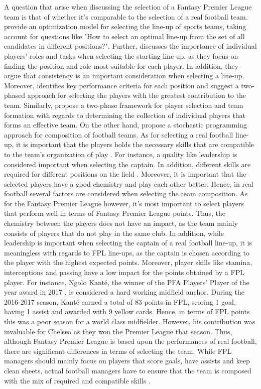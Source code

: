 A question that arise when discussing the selection of a Fantasy Premier League team is that of whether it's comparable to the selection of a real football team. \cite{Boon} provide an optimization model for selecting the line-up of sports teams, taking account for questions like "How to select an optimal line-up from the set of all candidates in different positions?". Further, \cite{Trninic} discusses the importance of individual players' roles and tasks when selecting the starting line-up, as they focus on finding the position and role most suitable for each player. In addition, they argue that consistency is an important consideration when selecting a line-up. Moreover, \cite{Ozceylan} identifies key performance criteria for each position and suggest a two-phased approach for selecting the players with the greatest contribution to the team. Similarly, \cite{Tavana} propose a two-phase framework for player selection and team formation with regards to determining the collection of individual players that forms an effective team. On the other hand, \cite{Pantuso} propose a stochastic programming approach for composition of football teams. 
\newpar
As for selecting a real football line-up, it is important that the players holds the necessary skills that are compatible to the team's organization of play \citep{Pantuso}. For instance, a quality like leadership is considered important when selecting the captain. In addition, different skills are required for different positions on the field \citep{Boon}. Moreover, it is important that the selected players have a good chemistry and play each other better. Hence, in real football several factors are considered when selecting the team composition. As for the Fantasy Premier League however, it's most important to select players that perform well in terms of Fantasy Premier League points. Thus, the chemistry between the players does not have an impact, as the team mainly consists of players that do not play in the same club. In addition, while leadership is important when selecting the captain of a real football line-up, it is meaningless with regards to FPL line-ups, as the captain is chosen according to the player with the highest expected points. Moreover, player skills like stamina, interceptions and passing have a low impact for the points obtained by a FPL player. For instance, Ngolo Kant\'e, the winner of the PFA Players' Player of the year award in 2017 \citep{Skysports_Kante}, is considered a hard working midfield anchor. During the 2016-2017 season, Kant\'e earned a total of 83 points in FPL, scoring 1 goal, having 1 assist and awarded with 9 yellow cards. Hence, in terms of FPL points this was a poor season for a world class midfielder. However, his contribution was invaluable for Chelsea as they won the Premier League that season. Thus, although Fantasy Premier League is based upon the performances of real football, there are significant differences in terms of selecting the team. While FPL managers should mainly focus on players that score goals, have assists and keep clean sheets, actual football managers have to ensure that the team is composed with the mix of required and compatible skills \citep{Pantuso}.



